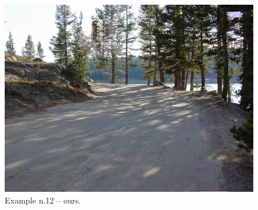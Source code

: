 \documentclass[a4paper, 11pt]{article}
\begin{document}
\begin{figure}
    \centering
    \includegraphics[width=.95\linewidth]{documentation/img/modified/0199.png}
    \caption{Example n.12 -- ours.}
    \label{img:ex_n.12_mask}
\end{figure}

\makeatletter
\def\@openbib@code{\addcontentsline{toc}{chapter}{Bibliography}}
\makeatother


\begin{flushleft}

\end{flushleft}
\end{document}
